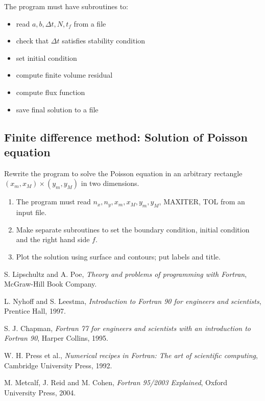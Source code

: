 \documentclass[11pt,oneside]{amsart}
\begin{document}
The program must have subroutines to:
\begin{itemize}
\item read $a,b,\Delta t, N, t_f$ from a file
\item check that $\Delta t$ satisfies stability condition
\item set initial condition
\item compute finite volume residual
\item compute flux function
\item save final solution to a file
\end{itemize}
\subsection{Finite difference method: Solution of Poisson equation}

Rewrite the program to solve the Poisson equation in an arbitrary rectangle $(x_m,x_M) \times (y_m,y_M)$ in two dimensions.

\begin{enumerate}
\item The program must read $n_x, n_y, x_m, x_M, y_m, y_M$, MAXITER, TOL from an input file.
\item Make separate subroutines to set the boundary condition, initial condition and the right hand side $f$.
\item Plot the solution using surface and contours; put labels and title.
\end{enumerate}

\begin{thebibliography}{99}

 S. Lipschultz and A. Poe, {\em Theory and problems of programming with Fortran}, McGraw-Hill Book Company.

 L. Nyhoff and S. Leestma, {\em Introduction to Fortran 90 for engineers and scientists}, Prentice Hall, 1997.

 S. J. Chapman, {\em Fortran 77 for engineers and scientists with an introduction to Fortran 90}, Harper Collins, 1995.

 W. H. Press et al., {\em Numerical recipes in Fortran: The art of scientific computing}, Cambridge University Press, 1992.

 M. Metcalf, J. Reid and M. Cohen, {\em Fortran 95/2003 Explained}, Oxford University Press, 2004.

\end{thebibliography}
\end{document}
